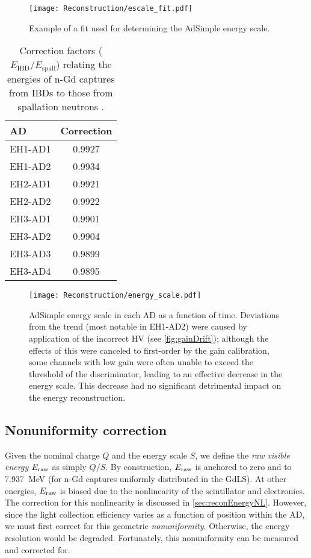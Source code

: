 \documentclass[../thesis.tex]{subfiles}
\begin{document}
\begin{figure}[ht]
  \texttt{[image: Reconstruction/escale\_fit.pdf]}
  \caption{Example of a fit used for determining the AdSimple energy scale.}
  \label{fig:escale_fit}
\end{figure}

\begin{table}[ht]
  \begin{tabular}{lc}
    \toprule
    AD & Correction \\
    \midrule
    EH1-AD1 & 0.9927 \\
    EH1-AD2 & 0.9934 \\
    EH2-AD1 & 0.9921 \\
    EH2-AD2 & 0.9922 \\
    EH3-AD1 & 0.9901 \\
    EH3-AD2 & 0.9904 \\
    EH3-AD3 & 0.9899 \\
    EH3-AD4 & 0.9895 \\
    \bottomrule
  \end{tabular}
  \caption{Correction factors ($E_{\mathrm{IBD}}/E_{\mathrm{spall}}$) relating the energies of n-Gd captures from IBDs to those from spallation neutrons \cite{spallScaleCorr}.}
  \label{tab:ibdSpallCorrs}
\end{table}

\begin{figure}[ht]
  \texttt{[image: Reconstruction/energy\_scale.pdf]}
  \caption{AdSimple energy scale in each AD as a function of time. Deviations from the trend (most notable in EH1-AD2) were caused by application of the incorrect HV (see \autoref{fig:gainDrift}); although the effects of this were canceled to first-order by the gain calibration, some channels with low gain were often unable to exceed the threshold of the discriminator, leading to an effective decrease in the energy scale. This decrease had no significant detrimental impact on the energy reconstruction.}
  \label{fig:energy_scales}
\end{figure}

\subsection{Nonuniformity correction}
\label{sec:reconEnergyNU}

Given the nominal charge $Q$ and the energy scale $S$, we define the \emph{raw visible energy} $E_\mathrm{raw}$ as simply $Q/S$. By construction, $E_\mathrm{raw}$ is anchored to zero and to 7.937~MeV (for n-Gd captures uniformly distributed in the GdLS). At other energies, $E_\mathrm{raw}$ is biased due to the nonlinearity of the scintillator and electronics. The correction for this nonlinearity is discussed in \autoref{sec:reconEnergyNL}. However, since the light collection efficiency varies as a function of position within the AD, we must first correct for this geometric \emph{nonuniformity}. Otherwise, the energy resolution would be degraded. Fortunately, this nonuniformity can be measured and corrected for.
\end{document}
